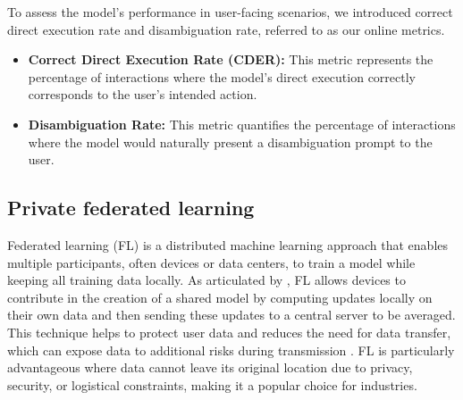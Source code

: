 To assess the model's performance in user-facing scenarios, we introduced correct direct execution rate and disambiguation rate, referred to as our online metrics.
\begin{itemize}
    \item \textbf{Correct Direct Execution Rate (CDER):} This metric represents the percentage of interactions where the model's direct execution correctly corresponds to the user's intended action.
    \item \textbf{Disambiguation Rate:} This metric quantifies the percentage of interactions where the model would naturally present a disambiguation prompt to the user.
\end{itemize}



\subsection{Private federated learning}

Federated learning (FL) \cite{McMahan2017LearningDP} is a distributed machine learning approach that enables multiple participants, often devices or data centers, to train a model while keeping all training data locally. As articulated by \cite{McMahan2017LearningDP}, FL allows devices to contribute in the creation of a shared model by computing updates locally on their own data and then sending these updates to a central server to be averaged. This technique helps to protect user data and reduces the need for data transfer, which can expose data to additional risks during transmission \cite{Konecn2016FederatedOD}. FL is particularly advantageous where data cannot leave its original location due to privacy, security, or logistical constraints, making it a popular choice for industries.

